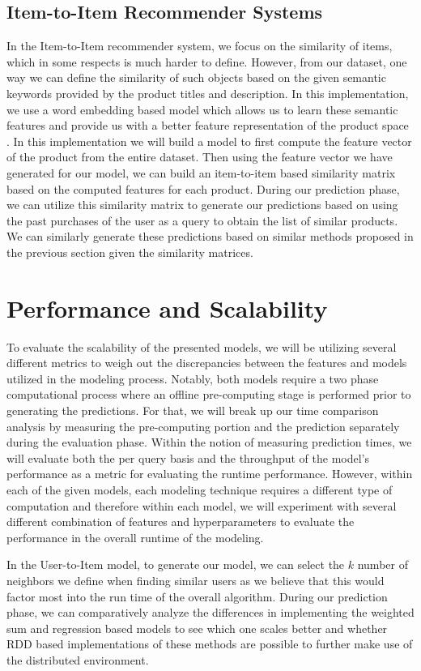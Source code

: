 \documentclass[a4paper, 11pt]{article}
\begin{document}
\subsection{Item-to-Item Recommender Systems}
In the Item-to-Item recommender system, we focus on the similarity of items, which in some respects is much harder to define. However, from our dataset, one way we can define the similarity of such objects based on the given semantic keywords provided by the product titles and description. In this implementation, we use a word embedding based model which allows us to learn these semantic features and provide us with a better feature representation of the product space \cite{Mikolov} \cite{QuocLe14}. In this implementation we will build a model to first compute the feature vector of the product from the entire dataset. Then using the feature vector we have generated for our model, we can build an item-to-item based similarity matrix based on the computed features for each product. During our prediction phase, we can utilize this similarity matrix to generate our predictions based on using the past purchases of the user as a query to obtain the list of similar products. We can similarly generate these predictions based on similar methods proposed in the previous section given the similarity matrices. 

\section*{Performance and Scalability}
To evaluate the scalability of the presented models, we will be utilizing several different metrics to weigh out the discrepancies between the features and models utilized in the modeling process. Notably, both models require a two phase computational process where an offline pre-computing stage is performed prior to generating the predictions. For that, we will break up our time comparison analysis by measuring the pre-computing portion and the prediction separately during the evaluation phase. Within the notion of measuring prediction times, we will evaluate both the per query basis and the throughput of the model's performance as a metric for evaluating the runtime performance. However, within each of the given models, each modeling technique requires a different type of computation and therefore within each model, we will experiment with several different combination of features and hyperparameters to evaluate the performance in the overall runtime of the modeling.

In the User-to-Item model, to generate our model, we can select the $k$ number of neighbors we define when finding similar users as we believe that this would factor most into the run time of the overall algorithm. During our prediction phase, we can comparatively analyze the differences in implementing the weighted sum and regression based models to see which one scales better and whether RDD based implementations of these methods are possible to further make use of the distributed environment.
\end{document}
